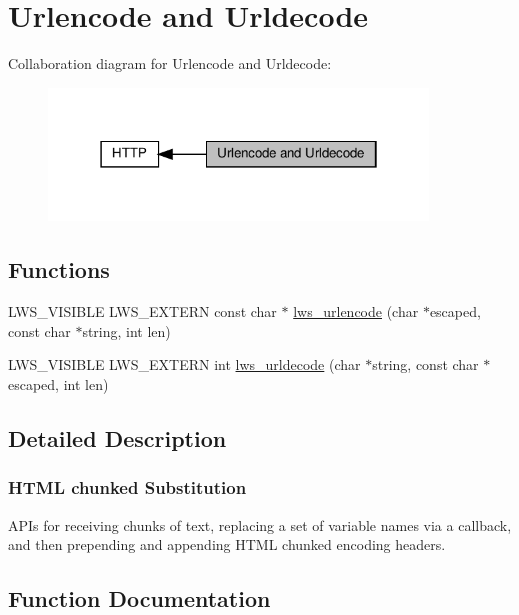 \hypertarget{group__urlendec}{}\section{Urlencode and Urldecode}
\label{group__urlendec}
Collaboration diagram for Urlencode and Urldecode\+:
\nopagebreak
\begin{figure}[H]
\begin{center}
\leavevmode
\includegraphics[width=286pt]{group__urlendec}
\end{center}
\end{figure}
\subsection*{Functions}
\begin{DoxyCompactItemize}
\item 
L\+W\+S\+\_\+\+V\+I\+S\+I\+B\+LE L\+W\+S\+\_\+\+E\+X\+T\+E\+RN const char $\ast$ \hyperlink{group__urlendec_gabc2888476e50e001c875c1a8abf455b7}{lws\+\_\+urlencode} (char $\ast$escaped, const char $\ast$string, int len)
\item 
L\+W\+S\+\_\+\+V\+I\+S\+I\+B\+LE L\+W\+S\+\_\+\+E\+X\+T\+E\+RN int \hyperlink{group__urlendec_gaa373a9c16acdd96c395af61ab915ece3}{lws\+\_\+urldecode} (char $\ast$string, const char $\ast$escaped, int len)
\end{DoxyCompactItemize}


\subsection{Detailed Description}
\subsubsection*{H\+T\+ML chunked Substitution}

A\+P\+Is for receiving chunks of text, replacing a set of variable names via a callback, and then prepending and appending H\+T\+ML chunked encoding headers. 

\subsection{Function Documentation}
\mbox{\label{group__urlendec_gaa373a9c16acdd96c395af61ab915ece3}} 
